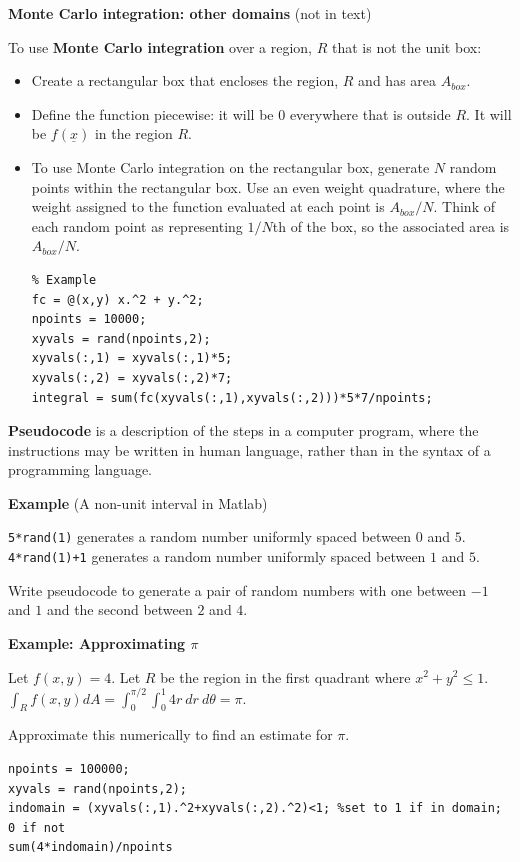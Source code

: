 \documentclass[12pt,letterpaper,noanswers]{exam}
\begin{document}
\noindent\textbf{Monte Carlo integration: other domains} (not in text)
\begin{tcolorbox}
To use \textbf{Monte Carlo integration} over a region, $R$ that is not the unit box:
\begin{itemize}
\itemsep0em
    \item Create a rectangular box that encloses the region, $R$ and has area $A_{box}$.
    \item Define the function piecewise: it will be $0$ everywhere that is outside $R$.  It will be $f(\underline{x})$ in the region $R$.
    \item To use Monte Carlo integration on the rectangular box, generate $N$ random points within the rectangular box.  Use an even weight quadrature, where the weight assigned to the function evaluated at each point is $A_{box}/N$.  Think of each random point as representing $1/N$th of the box, so the associated area is $A_{box}/N$.
    \begin{lstlisting}
% Example
fc = @(x,y) x.^2 + y.^2;
npoints = 10000;
xyvals = rand(npoints,2);
xyvals(:,1) = xyvals(:,1)*5;
xyvals(:,2) = xyvals(:,2)*7;
integral = sum(fc(xyvals(:,1),xyvals(:,2)))*5*7/npoints;
\end{lstlisting}
\end{itemize}

\textbf{Pseudocode} is a description of the steps in a computer program, where the instructions may be written in human language, rather than in the syntax of a programming language.
\end{tcolorbox}

    \noindent\textbf{Example} (A non-unit interval in Matlab)
    
    \texttt{5*rand(1)} generates a random number uniformly spaced between $0$ and $5$.  \texttt{4*rand(1)+1} generates a random number uniformly spaced between $1$ and $5$.
    
    Write pseudocode to generate a pair of random numbers with one between $-1$ and $1$ and the second between $2$ and $4$.
    \vspace{1in}
    
    \eject

\noindent\textbf{Example: Approximating $\pi$}

Let $f(x,y) = 4$.  Let $R$ be the region in the first quadrant where $x^2+y^2\leq 1$.  $\int_R f(x,y) dA = \int_0^{\pi/2}\int_0^1 4r\ dr\ d\theta = \pi$.

Approximate this numerically to find an estimate for $\pi$.
\begin{lstlisting}   
npoints = 100000;
xyvals = rand(npoints,2);
indomain = (xyvals(:,1).^2+xyvals(:,2).^2)<1; %set to 1 if in domain; 0 if not
sum(4*indomain)/npoints
\end{lstlisting}
\end{document}
